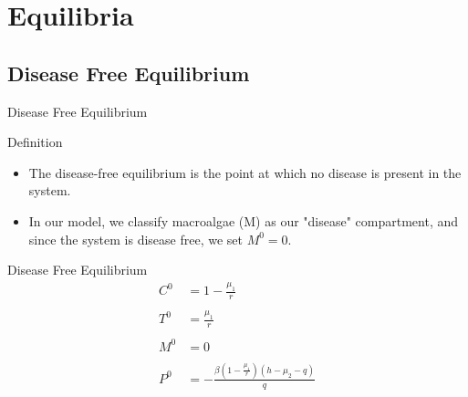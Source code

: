 \documentclass{beamer}
\begin{document}


\section{Equilibria}
\subsection{Disease Free Equilibrium}
\begin{frame}{Disease Free Equilibrium}
    \begin{block}{Definition}
        \begin{itemize}
            \item The disease-free equilibrium is the point at which no disease is present in the system.
            \item In our model, we classify macroalgae (M) as our "disease" compartment, and since the system is disease free, we set $M^{0} = 0$.
        \end{itemize}
    \end{block}
\end{frame}

\begin{frame}{Disease Free Equilibrium}
    \begin{align*}
        C^{0} &= 1 - \frac{\mu_{1}}{r}\\
        \\
        T^{0} &= \frac{\mu_{1}}{r}\\
        \\
        M^{0} &= 0\\
        \\
        P^{0} &= -\frac{\beta(1 - \frac{\mu_{1}}{r})(h - \mu_{2} - q)}{q}\\
    \end{align*}
\end{frame}
\end{document}
